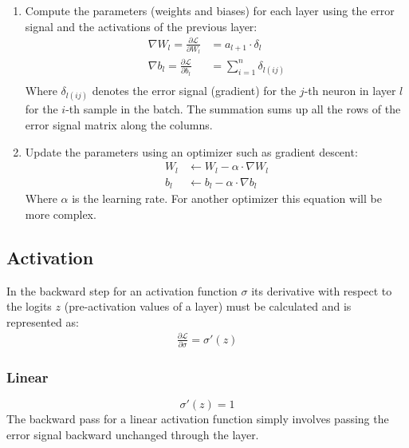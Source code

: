 \documentclass[a4paper]{article}
\newcommand{\ELL}{\mathcal{L}}
\begin{document}
\begin{enumerate}
    \item Compute the parameters (weights and biases) for each layer using the error signal and the activations of the previous layer:
    \begin{align*}
        \nabla W_l = \frac{\partial\ELL}{\partial W_l} &= a_{l+1} \cdot \delta_l \\
        \nabla b_l =\frac{\partial\ELL}{\partial b_l} &= \sum_{i=1}^{n} \delta_{l(ij)} \\
    \end{align*}
    Where $\delta_{l(ij)}$ denotes the error signal (gradient) for the $j$-th neuron in layer $l$ for the $i$-th sample in the batch. The summation sums up all the rows of the error signal matrix along the columns.
    \item Update the parameters using an optimizer such as gradient descent:
    \begin{align*}
        W_l &\leftarrow W_l - \alpha \cdot \nabla W_l\\
        b_l &\leftarrow b_l - \alpha \cdot \nabla b_l
    \end{align*}
    Where $\alpha$ is the learning rate. For another optimizer this equation will be more complex.
\end{enumerate}


\subsection*{Activation}
In the backward step for an activation function $\sigma$ its derivative with respect to the logits $z$ (pre-activation values of a layer) must be calculated and is represented as:
\begin{align*}
    \frac{\partial\ELL}{\partial\sigma} = \sigma'(z)
\end{align*}

\subsubsection*{Linear}
\begin{equation*}
    \sigma'(z) = 1
\end{equation*}
The backward pass for a linear activation function simply involves passing the error signal backward unchanged through the layer.
\end{document}
